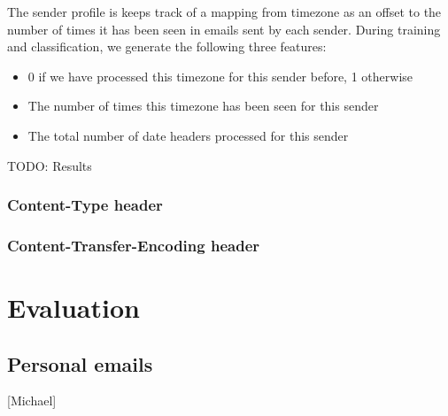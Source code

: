 \documentclass[letterpaper]{article}
\begin{document}
The sender profile is keeps track of a mapping from timezone as an offset to the number of times it has been seen in emails sent by each sender. During training and classification, we generate the following three features:

\begin{itemize}
\item  0 if we have processed this timezone for this sender before, 1 otherwise
\item The number of times this timezone has been seen for this sender
\item The total number of date headers processed for this sender
\end{itemize}

TODO: Results\\

\subsubsection{Content-Type header}
\subsubsection{Content-Transfer-Encoding header}
\section{Evaluation}
\subsection{Personal emails}
[Michael]
\end{document}
